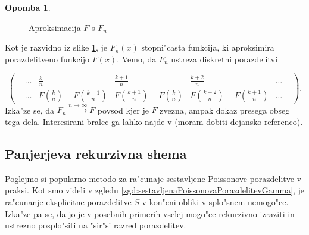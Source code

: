 \documentclass[12pt, a4paper, reqno]{amsart}
\theoremstyle{definition}
\newtheorem{opomba}[definicija]{Opomba}
\theoremstyle{plain}
\newcommand{\1}{\mathds{1}}
\begin{document}
\begin{opomba}
\begin{figure}[H]
\begin{center}
\begin{tikzpicture}
                
                
                \end{tikzpicture}
                \caption{Aproksimacija $F$ s $F_n$}
                \label{fig:slika2}
            \end{center}
        \end{figure}

    \noindent
    Kot je razvidno iz slike \ref{fig:slika2}, je $F_n(x)$ stopni"casta funkcija, ki aproksimira 
    porazdelitveno funkcijo $F(x)$. Vemo, da $F_n$ ustreza diskretni porazdelitvi

    $$ 
    \begin{pmatrix}
        & \dots & \frac{k}{n} & \frac{k + 1}{n} & \frac{k+2}{n} & \dots & \\
        & \dots & F(\frac{k}{n}) - F(\frac{k-1}{n}) & F(\frac{k+1}{n}) - F(\frac{k}{n}) & F(\frac{k+2}{n}) - F(\frac{k+1}{n}) & \dots & 
    \end{pmatrix}.
    $$
    Izka"ze se, da $F_n \xrightarrow{n\to\infty}F$ povsod kjer je $F$ zvezna, ampak
    dokaz presega obseg tega dela. Interesirani bralec ga lahko najde v \cite{4} (moram dobiti dejansko referenco).
    \label{op:aproksimacijaZDiskretno}
    \end{opomba}





    \subsection{Panjerjeva rekurzivna shema}
    Poglejmo si popularno metodo za ra"cunaje sestavljene Poissonove porazdelitve v praksi. Kot
    smo videli v zgledu \ref{zgd:sestavljenaPoissonovaPorazdelitevGamma}, je ra"cunanje eksplicitne 
    porazdelitve $S$ v kon"cni obliki v splo"snem nemogo"ce. Izka"ze pa se, da jo je v posebnih primerih vselej mogo"ce
    rekurzivno izraziti in ustrezno posplo"siti na "sir"si razred porazdelitev.
\end{document}
